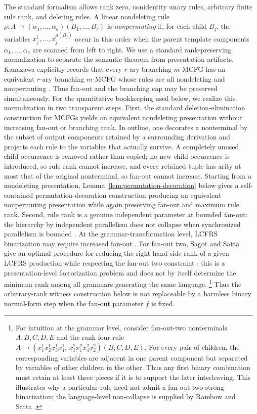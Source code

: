 \documentclass[11pt,a4paper]{article}
\numberwithin{equation}{section}
\theoremstyle{plain}
\theoremstyle{definition}
\theoremstyle{remark}
\begin{document}
The standard formalism allows rank zero, nonidentity unary rules, arbitrary
finite rule rank, and deleting rules.  A linear nondeleting rule
\(\rho:A\to(\alpha_1,\ldots,\alpha_e)(B_1,\ldots,B_r)\) is
\emph{nonpermuting} if, for each child \(B_j\), the variables
\(x_j^1,\ldots,x_j^{\mu(B_j)}\) occur in this order when the parent template
components \(\alpha_1,\ldots,\alpha_e\) are scanned from left to right.
We use a standard rank-preserving normalization to separate the semantic
theorem from presentation artifacts.  Kanazawa explicitly records that every
$r$-ary branching $m$-MCFG has an equivalent $r$-ary branching $m$-MCFG whose
rules are all nondeleting and nonpermuting
\cite[Section~2]{Kanazawa2019Ogden}.  Thus fan-out and the branching cap may be
preserved simultaneously.  For the quantitative bookkeeping used below, we
realize this normalization in two transparent steps.  First, the standard
deletion-elimination construction for MCFGs
\cite[Lemma~2.2]{SekiEtAl1991} yields an equivalent nondeleting presentation
without increasing fan-out or branching rank.  In outline, one decorates a
nonterminal by the subset of output components retained by a surrounding
derivation and projects each rule to the variables that actually survive.  A
completely unused child occurrence is removed rather than copied; no new child
occurrence is introduced, so rule rank cannot increase, and every retained
tuple has arity at most that of the original nonterminal, so fan-out cannot
increase.  Starting from a nondeleting presentation,
Lemma~\ref{lem:permutation-decoration} below gives a self-contained
permutation-decoration construction producing an equivalent nonpermuting
presentation while again preserving fan-out and maximum rule rank.  Second,
rule rank is a genuine independent parameter at bounded fan-out: the hierarchy
by independent parallelism does not collapse when synchronized parallelism is
bounded \cite{RambowSatta1999}.  At the grammar-transformation level, LCFRS
binarization may require increased fan-out \cite{GomezRodriguezEtAl2009}.
For fan-out two, Sagot and Satta give an optimal procedure for reducing the
right-hand-side rank of a given LCFRS production while respecting the fan-out
two constraint \cite{SagotSatta2010}; this is a presentation-level
factorization problem and does not by itself determine the minimum rank among
all grammars generating the same language.%
\footnote{For intuition at the grammar level, consider fan-out-two
nonterminals \(A,B,C,D,E\) and the rank-four rule
\(A\to(x_1^1x_2^1x_3^1x_4^1,\,
 x_3^2x_1^2x_4^2x_2^2)(B,C,D,E)\).
For every pair of children, the corresponding variables are adjacent in one
parent component but separated by variables of other children in the other.
Thus any first binary combination must retain at least three pieces if it is
to support the later interleaving.  This illustrates why a particular rule
need not admit a fan-out-two strong binarization; the language-level
non-collapse is supplied by Rambow and Satta \cite{RambowSatta1999}.}
Thus the arbitrary-rank witness construction below is not replaceable by a
harmless binary normal-form step when the fan-out parameter \(f\) is fixed.
\end{document}
